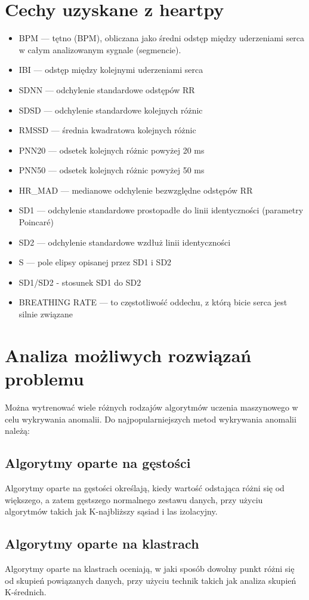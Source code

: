 \documentclass[12pt]{article}
\begin{document}
\section{Cechy uzyskane z heartpy}
\begin{itemize}
    \item BPM — tętno (BPM), obliczana jako średni odstęp między uderzeniami serca w całym analizowanym sygnale (segmencie).
    \item IBI — odstęp między kolejnymi uderzeniami serca
    \item SDNN — odchylenie standardowe odstępów RR
    \item SDSD — odchylenie standardowe kolejnych różnic
    \item RMSSD — średnia kwadratowa kolejnych różnic
    \item PNN20 — odsetek kolejnych różnic powyżej 20 ms
    \item PNN50 — odsetek kolejnych różnic powyżej 50 ms
    \item HR\_MAD — medianowe odchylenie bezwzględne odstępów RR
    \item SD1 — odchylenie standardowe prostopadłe do linii identyczności (parametry Poincaré)
    \item SD2 — odchylenie standardowe wzdłuż linii identyczności
    \item S — pole elipsy opisanej przez SD1 i SD2
    \item SD1/SD2 - stosunek SD1 do SD2
    \item BREATHING RATE — to częstotliwość oddechu, z którą bicie serca jest silnie związane
\end{itemize}

\section{Analiza możliwych rozwiązań problemu}
Można wytrenować wiele różnych rodzajów algorytmów uczenia maszynowego w celu wykrywania anomalii. Do najpopularniejszych metod wykrywania anomalii należą:

\subsection{Algorytmy oparte na gęstości}
Algorytmy oparte na gęstości określają, kiedy wartość odstająca różni się od większego, a zatem gęstszego normalnego zestawu danych, przy użyciu algorytmów takich jak K-najbliższy sąsiad i las izolacyjny.

\subsection{Algorytmy oparte na klastrach}
Algorytmy oparte na klastrach oceniają, w jaki sposób dowolny punkt różni się od skupień powiązanych danych, przy użyciu technik takich jak analiza skupień K-średnich.
\end{document}
